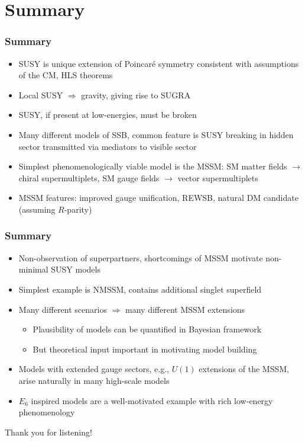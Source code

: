 \documentclass[10pt,aspectratio=169]{beamer}
\begin{document}
\section{Summary}

\begin{frame}
  \frametitle{Summary}

  \begin{itemize}\itemsep1em
  \item SUSY is unique extension of Poincar\'{e} symmetry consistent with
    assumptions of the CM, HLS theorems
  \item Local SUSY $\Rightarrow$ gravity, giving rise to SUGRA
  \item SUSY, if present at low-energies, must be broken
  \item Many different models of SSB, common feature is SUSY breaking in
    hidden sector transmitted via mediators to visible sector
  \item Simplest phenomenologically viable model is the MSSM:
    SM matter fields $\to$ chiral supermultiplets,
    SM gauge fields $\to$ vector supermultiplets
  \item MSSM features: improved gauge unification, REWSB, natural DM
    candidate (assuming $R$-parity)
  \end{itemize}

\end{frame}

\begin{frame}
  \frametitle{Summary}

  \begin{itemize}\itemsep1em
  \item Non-observation of superpartners, shortcomings of MSSM motivate
    non-minimal SUSY models
  \item Simplest example is NMSSM, contains additional singlet superfield
  \item Many different scenarios $\Rightarrow$ many different MSSM extensions
    \begin{itemize} \itemsep0.5em
    \item Plausibility of models can be quantified in Bayesian framework
    \item But theoretical input important in motivating model building
    \end{itemize}
  \item Models with extended gauge sectors, e.g., $U(1)$ extensions of the MSSM,
    arise naturally in many high-scale models
  \item $E_6$ inspired models are a well-motivated example with
    rich low-energy phenomenology
  \end{itemize}
  \vspace{5pt}
  \begin{center}
    \large Thank you for listening!
  \end{center}

\end{frame}
\end{document}
